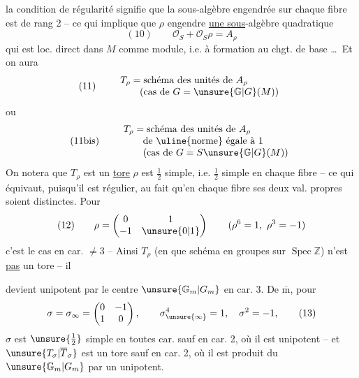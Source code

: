la condition de régularité signifie que la sous-algèbre engendrée sur chaque fibre est de rang 2  -- ce qui implique que $\rho$ engendre \uline{une sous}-algèbre quadratique
\[
(10)\qquad \mathcal O_S+\mathcal O_S\rho=A_\rho
\]
qui est loc.  direct dans $M$ comme module, i.e. à formation  au chgt. de base \ldots\ Et on aura
\[
(11)\qquad
\begin{array}{l}
T_\rho=\text{schéma des unités de }A_\rho\\
\qquad\text{(cas de }G=\unsure{\mathbb G|G}(M)\text{)}
\end{array}
\]
ou
\[
(11\text{bis})\qquad
\begin{array}{l}
T_\rho=\text{schéma des unités de }A_\rho\\
\qquad\text{de \uline{norme} égale à }1\\
\qquad\text{(cas de }G=S\unsure{\mathbb G|G}(M)\text{)}
\end{array}
\]
On notera que $T_\rho$ est un \uline{tore}   $\rho$ est $\frac{1}{2}$ simple, i.e. $\frac{1}{2}$ simple en chaque fibre -- ce qui équivaut, puisqu'il est régulier, au fait qu'en chaque fibre ses deux val. propres soient distinctes. Pour
\[
(12)\qquad \rho=\begin{pmatrix}0&1\\-1&\unsure{0|1}\end{pmatrix}\qquad (\rho^6=1,\ \rho^3=-1)
\]
c'est  le cas en car. $\ne 3$ --   Ainsi $T_\rho$ (en  que schéma en groupes sur $\operatorname{Spec}\mathbb Z$) n'est \uline{pas} un tore -- il


devient   unipotent par le centre $\unsure{\mathbb G_m|G_m}$ en car. 3. De $\overline{\mathrm m}$, pour
\[
\sigma=\sigma_\infty=\begin{pmatrix}0&-1\\1&0\end{pmatrix},\qquad
\sigma_{\unsure{\infty}}^4=1,\quad\sigma^2=-1,
\tag{13}
\]
$\sigma$ est $\unsure{\frac12}$ simple en toutes car. sauf en car. 2,
où il est unipotent -- et $\unsure{T_\sigma|\overline T_\sigma}$ est un
tore sauf en car. 2, où il  est
produit du  $\unsure{\mathbb G_m|G_m}$ par un unipotent.

